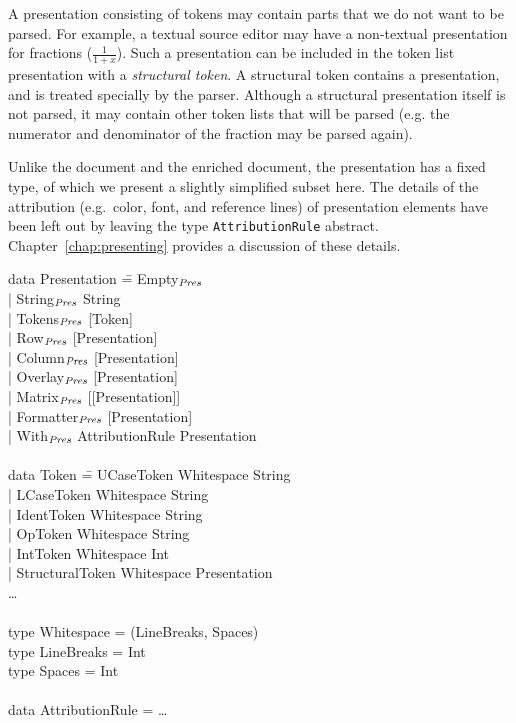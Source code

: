 \documentclass{speauth}
\begin{document}
A presentation consisting of tokens may contain parts that we do not want to be parsed. For example, a textual source editor may have a non-textual presentation for fractions ($\frac{1}{1+x}$). Such a presentation can be included in the token list presentation with a {\em structural token}. A structural token contains a presentation, and is treated specially by the parser. Although a structural presentation itself is not parsed, it may contain other token lists that will be parsed (e.g. the numerator and denominator of the fraction may be parsed again).

Unlike the document and the enriched document, the presentation has a fixed type, of which we present a slightly simplified subset here. The details of the attribution (e.g.\ color, font, and reference lines) of presentation elements have been left out by leaving the type \verb|AttributionRule| abstract. Chapter~\ref{chap:presenting} provides a discussion of these details. 


\noindent
\ttfamily
\begin{tabbing}
data Presentation \= = Empty$_{\mathit{Pres}}$\\
                  \> | String$_{\mathit{Pres}}$ String \\
                  \> | Tokens$_{\mathit{Pres}}$ [Token]\\
                  \> | Row$_{\mathit{Pres}}$ [Presentation]\\
                  \> | Column$_{\mathit{Pres}}$ [Presentation]\\
                  \> | Overlay$_{\mathit{Pres}}$ [Presentation]\\
                  \> | Matrix$_{\mathit{Pres}}$ [[Presentation]]\\
                  \> | Formatter$_{\mathit{Pres}}$ [Presentation]\\
                  \> | With$_{\mathit{Pres}}$ AttributionRule Presentation\\
\\
data Token \= = UCaseToken Whitespace String\\
           \> | LCaseToken Whitespace String\\
           \> | IdentToken Whitespace String\\
           \> | OpToken Whitespace String\\
           \> | IntToken Whitespace Int\\
           \> | StructuralToken Whitespace Presentation\\
           \> \dots \\
\\
type Whitespace = (LineBreaks, Spaces)\\
type LineBreaks = Int\\
type Spaces = Int\\
\\
data AttributionRule = \dots\\
\end{tabbing}
\rmfamily
\end{document}
